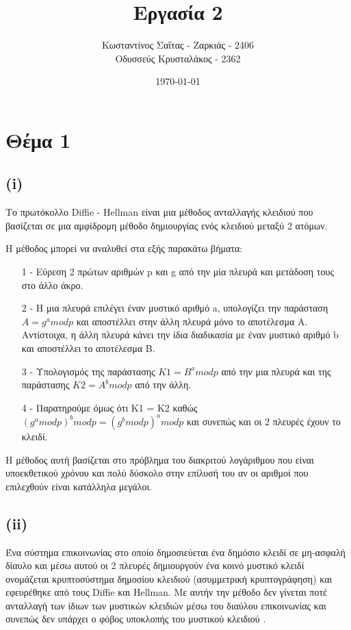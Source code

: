 \documentclass[a4paper, 11pt]{article}
\title{Εργασία 2}
\author{Κωσταντίνος Σαΐτας - Ζαρκιάς - 2406 \\ Οδυσσεύς Κρυσταλάκος - 2362}
\date{\today}
\newcommand{\lt}{\latintext}
\begin{document}
\maketitle

\section*{Θέμα 1}


\subsection*{({\lt i})}

Το πρωτόκολλο {\lt Diffie - Hellman} είναι μια μέθοδος ανταλλαγής κλειδιού που βασίζεται σε μια αμφίδρομη μέθοδο δημιουργίας ενός κλειδιού μεταξύ 2 ατόμων.

Η μέθοδος μπορεί να αναλυθεί στα εξής παρακάτω βήματα:

\begin{itemize}

\item[1 -] Εύρεση 2 πρώτων αριθμών {\lt p} και {\lt g} από την μία πλευρά και μετάδοση τους στο άλλο άκρο.

\item[2 -] Η μια πλευρά επιλέγει έναν μυστικό αριθμό {\lt a}, υπολογίζει την παράσταση $A = g^a mod p$ και αποστέλλει στην άλλη πλευρά μόνο το αποτέλεσμα {\lt A}. Αντίστοιχα, η άλλη πλευρά κάνει την ίδια διαδικασία με έναν μυστικό αριθμό {\lt b} και αποστέλλει το αποτέλεσμα {\lt B}.

\item[3 -] Υπολογισμός της παράστασης $ K1 = B^a mod p $ από την μια πλευρά και της παράστασης $ K2 = A^b mod p $ από την άλλη.

\item[4 -] Παρατηρούμε όμως ότι Κ1 = Κ2 καθώς $ (g^a mod p)^b mod p = (g^b mod p)^a mod p $ και συνεπώς και οι 2 πλευρές έχουν το κλειδί.


\end{itemize}

Η μέθοδος αυτή βασίζεται στο πρόβλημα του διακριτού λογάριθμου που είναι υποεκθετικού χρόνου και πολύ δύσκολο στην επίλυσή του αν οι αριθμοί που επιλεχθούν είναι κατάλληλα μεγάλοι.


\subsection*{({\lt ii})} Ένα σύστημα επικοινωνίας στο οποίο δημοσιεύεται ένα δημόσιο κλειδί σε μη-ασφαλή δίαυλο και μέσω αυτού οι 2 πλευρές δημιουργούν ένα κοινό μυστικό κλειδί ονομάζεται κρυπτοσύστημα δημοσίου κλειδιού (ασυμμετρική κρυπτογράφηση) και εφευρέθηκε από τους {\lt Diffie} και {\lt Hellman}. Με αυτήν την μέθοδο δεν γίνεται ποτέ ανταλλαγή των ίδιων των μυστικών κλειδιών μέσω του διαύλου επικοινωνίας και συνεπώς δεν υπάρχει ο φόβος υποκλοπής του μυστικού κλειδιού	.
\end{document}
